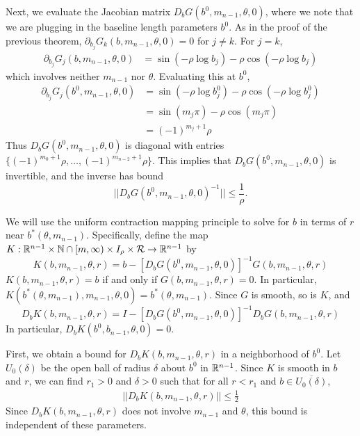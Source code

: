 \documentclass[thesis.tex]{subfiles}
\begin{document}
Next, we evaluate the Jacobian matrix $D_b G(b^0, m_{n-1}, \theta, 0)$, where we note that we are plugging in the baseline length parameters $b^0$. As in the proof of the previous theorem, $\partial_{b_j} G_k(b, m_{n-1}, \theta, 0) = 0$ for $j \neq k$. For $j = k$,
\begin{align*}
\partial_{b_j} G_j(b, m_{n-1}, \theta, 0) &= \sin \left( -\rho \log b_j \right) - \rho \cos \left( -\rho \log b_j \right) 
\end{align*}
which involves neither $m_{n-1}$ nor $\theta$. Evaluating this at $b^0$,
\begin{align*}
\partial_{b_j} G_j(b^0, m_{n-1}, \theta, 0) &= \sin \left( -\rho \log b_j^0 \right) - \rho \cos \left( -\rho \log b_j^0 \right) \\
&= \sin \left( m_j \pi \right) - \rho \cos \left(m_j \pi \right) \\
&= (-1)^{m_j + 1} \rho
\end{align*}
Thus $D_b G(b^0, m_{n-1}, \theta, 0)$ is diagonal with entries $\{ (-1)^{m_0 + 1} \rho, \dots, (-1)^{m_{n-2} + 1} \rho \}$. This implies that $D_b G(b^0, m_{n-1}, \theta, 0)$ is invertible, and the inverse has bound
\begin{equation}\label{DbG0invbound}
||D_b G(b^0, m_{n-1}, \theta, 0)^{-1}|| \leq \frac{1}{\rho}.
\end{equation}

We will use the uniform contraction mapping principle to solve for $b$ in terms of $r$ near $b^*(\theta, m_{n-1})$. Specifically, define the map $K: \mathbb{R}^{n-1} \times \mathbb{N} \cap [m, \infty) \times I_\rho \times \mathcal{R} \rightarrow \mathbb{R}^{n-1}$ by
\begin{equation}\label{defKb}
K(b, m_{n-1}, \theta, r) = b - [D_b G(b^0, m_{n-1}, \theta, 0)]^{-1} G(b, m_{n-1}, \theta, r)
\end{equation}
$K(b, m_{n-1}, \theta, r) = b$ if and only if $G(b, m_{n-1}, \theta, r) = 0$. In particular, $K(b^*(\theta, m_{n-1}), m_{n-1}, \theta, 0) = b^*(\theta, m_{n-1})$. Since $G$ is smooth, so is $K$, and 
\begin{equation}\label{DbK}
D_b K(b, m_{n-1}, \theta, r) = I - [D_b G(b^0, m_{n-1}, \theta, 0)]^{-1} D_b G(b, m_{n-1}, \theta, r)
\end{equation}
In particular, $D_b K(b^0, b_{n-1}, \theta, 0) = 0$.

First, we obtain a bound for $D_b K(b, m_{n-1}, \theta, r)$ in a neighborhood of $b^0$. Let $U_0(\delta)$ be the open ball of radius $\delta$ about $b^0$ in $\mathbb{R}^{n-1}$. Since $K$ is smooth in $b$ and $r$, we can find $r_1 > 0$ and $\delta > 0$ such that for all $r < r_1$ and $b \in \overline{ U_0(\delta) }$,  
\begin{align}\label{DbKbound}
|| D_b K(b, m_{n-1}, \theta, r)|| \leq \frac{1}{2}
\end{align}
Since $D_b K(b, m_{n-1}, \theta, r)$ does not involve $m_{n-1}$ and $\theta$, this bound is independent of these parameters.
\end{document}
